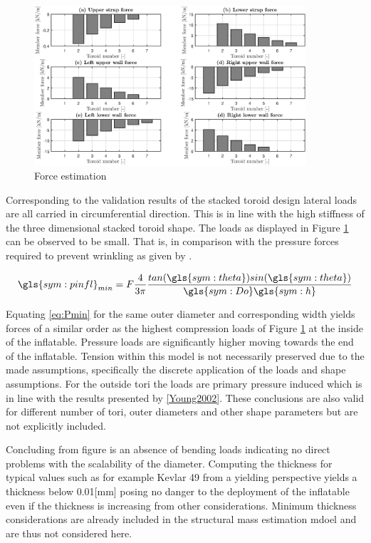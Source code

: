 \begin{figure}[h]
	\centering
	\includegraphics[width=0.9\textwidth]{./Figure/Structure/forces_test.eps}
	\caption{Force estimation }
	\label{fig:forces}
\end{figure}

Corresponding to the validation results of the stacked toroid design lateral loads are all carried in circumferential direction. This is in line with the high stiffness of the three dimensional stacked toroid shape. The loads as displayed in Figure \ref{fig:forces} can be observed to be small. That is, in comparison with the pressure forces required to prevent wrinkling as given by \cite{Brown2009}. 

\begin{equation}
\label{eq:Pmin}
\gls{sym:pinfl}_{min} = F \frac{4}{3 \pi} \frac{tan(\gls{sym:theta})sin(\gls{sym:theta}) }{\gls{sym:Do}\gls{sym:h}}
\end{equation}

Equating \ref{eq:Pmin} for the same outer diameter and corresponding width yields forces of a similar order as the highest compression loads of Figure \ref{fig:forces} at the inside of the inflatable. Pressure loads are significantly higher moving towards the end of the inflatable. Tension within this model is not necessarily preserved due to the made assumptions, specifically the discrete application of the loads and shape assumptions. For the outside tori the loads are primary pressure induced which is in line with the results presented by \ref{Young2002}. These conclusions are also valid for different number of tori, outer diameters and other shape parameters but are not explicitly included. 

Concluding from figure \label{fig:forces} is an absence of bending loads indicating no direct problems with the scalability of the diameter. Computing the thickness for typical values such as for example Kevlar 49 from a yielding perspective yields a thickness below 0.01[mm] posing no danger to the deployment of the inflatable even if the thickness is increasing from other considerations. Minimum thickness considerations are already included in the structural mass estimation mdoel and are thus not considered here.
